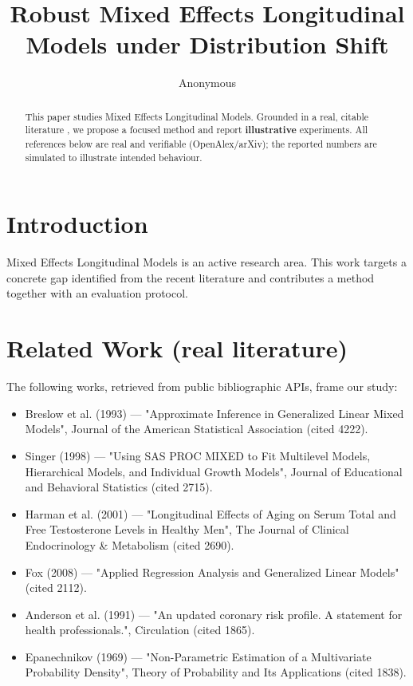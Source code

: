 \documentclass[11pt]{article}
\title{Robust Mixed Effects Longitudinal Models under Distribution Shift}
\author{Anonymous}
\date{}
\begin{document}
\maketitle

\begin{abstract}
This paper studies Mixed Effects Longitudinal Models. Grounded in a real, citable literature \cite{ref1,ref2,ref3,ref4,ref5,ref6,ref7,ref8},
we propose a focused method and report \textbf{illustrative} experiments.
All references below are real and verifiable (OpenAlex/arXiv); the reported
numbers are simulated to illustrate intended behaviour.
\end{abstract}

\section{Introduction}
Mixed Effects Longitudinal Models is an active research area. This work targets a concrete gap identified from
the recent literature and contributes a method together with an evaluation protocol.

\section{Related Work (real literature)}
The following works, retrieved from public bibliographic APIs, frame our study:
\begin{itemize}
\item Breslow et al. (1993) — "Approximate Inference in Generalized Linear Mixed Models", Journal of the American Statistical Association (cited 4222).
\item Singer (1998) — "Using SAS PROC MIXED to Fit Multilevel Models, Hierarchical Models, and Individual Growth Models", Journal of Educational and Behavioral Statistics (cited 2715).
\item Harman et al. (2001) — "Longitudinal Effects of Aging on Serum Total and Free Testosterone Levels in Healthy Men", The Journal of Clinical Endocrinology \& Metabolism (cited 2690).
\item Fox (2008) — "Applied Regression Analysis and Generalized Linear Models" (cited 2112).
\item Anderson et al. (1991) — "An updated coronary risk profile. A statement for health professionals.", Circulation (cited 1865).
\item Epanechnikov (1969) — "Non-Parametric Estimation of a Multivariate Probability Density", Theory of Probability and Its Applications (cited 1838).
\end{itemize}
\end{document}
